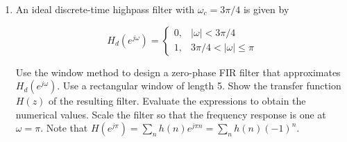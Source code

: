 \documentclass[fleqn]{article}
\begin{document}
\begin{enumerate}[nolistsep]
		\item An ideal discrete-time highpass filter with $\omega_c = 3\pi/4$ is given by
		
		\begin{equation*}
			H_d(e^{j\omega}) = 
			\begin{cases}
				0, & |\omega| < 3\pi/4 \\
				1, & 3\pi/4 < |\omega| \leq \pi
			\end{cases}
		\end{equation*}
		
		Use the window method to design a zero-phase FIR filter that approximates $H_d(e^{j\omega})$. Use a rectangular window of length 5. Show the transfer function $H(z)$ of the resulting filter. Evaluate the expressions to obtain the numerical values. Scale the filter so that the frequency response is one at $\omega = \pi$. Note that $H(e^{j\pi}) = \sum_{n}{h(n)e^{j{\pi}n}} = \sum_{n}{h(n)(-1)^n}$.
	\end{enumerate}
\end{document}
